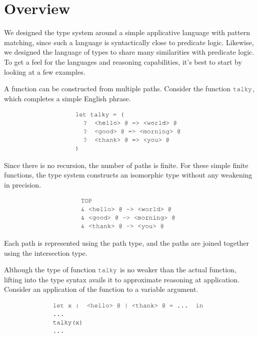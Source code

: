\documentclass[acmsmall]{acmart}
\theoremstyle{definition}
\begin{document}
\section{Overview}
\label{sec:overview}
We designed the type system around a simple applicative language with pattern matching,
since such a language is syntactically close to predicate logic. Likewise,
we designed the language of types to share many similarities with predicate logic. 
To get a feel for the languages and reasoning capabilities, it's best to start by
looking at a few examples.


A function can be constructed from multiple paths. 
Consider the function $\J{talky}$, which completes a simple English phrase.

\[
  \begin{array}[t]{@{} l}
    \J{let talky = (}
      \\
      \I \J{? <hello> @ => <world> @}
      \\
      \I \J{? <good> @ => <morning> @} 
      \\
      \I \J{? <thank> @ => <you> @} 
      \\
    \J{)}
  \end{array}
\]

Since there is no recursion, the number of paths is finite.
For these simple finite functions, the type system constructs
an isomorphic type without any weakening in precision. 

\[
  \begin{array}[t]{@{} l}
    \J{TOP}
      \\
      \J{\& <hello> @ -> <world> @}
      \\
      \J{\& <good> @ -> <morning> @} 
      \\
      \J{\& <thank> @ -> <you> @} 
  \end{array}
\]

Each path is represented using the path type,
and the paths are joined together using the intersection type.

Although the type of function $\J{talky}$ is no weaker than the actual function,
lifting into the type syntax avails it to approximate reasoning at application.
Consider an application of the function to a variable argument. 

\[
  \begin{array}[t]{@{} l}
    \J{let x : <hello> @ | <thank> @ = ... in}
    \\
    \J{...}
    \\
    \J{talky(x)} 
    \\
    \J{...}
  \end{array}
\]
\end{document}
